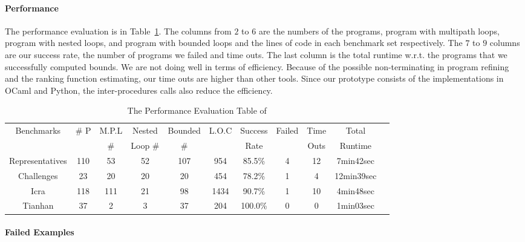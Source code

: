 \paragraph{Performance}
The performance evaluation is in Table~\ref{tb:performance-eval}.
The columns from $2$ to $6$ are the numbers of the programs, program with multipath loops, program with nested loops, and program with bounded loops and the lines of code in each benchmark set respectively.
The $7$ to $9$ columns are our success rate, the number of programs we failed and time outs. The last column is the total runtime w.r.t. the programs that we successfully computed bounds.
We are not doing well in terms of efficiency. Because of the possible non-terminating in program refining and the ranking function estimating, our time outs are higher than other tools.
Since our prototype consists of the implementations in OCaml and Python, the inter-procedures calls also reduce the efficiency.
%
%
\begin{table}[H]
\caption{The Performance Evaluation Table of {\PSRB}}
\label{tb:performance-eval}
    \centering
{\scriptsize
\begin{tabular}{ | c | c | c | c | c | c | c | c | c | c | c |}
\hline
\hline
\multirow{2}{*}{Benchmarks} & \multirow{2}{*}{\# P}  & {M.P.L} & Nested  & {Bounded} 
& \multirow{2}{*}{L.O.C} & {Success} & \multirow{2}{*}{Failed} & Time  & Total
\\
&  & \# & Loop \# & \# & & Rate &  & Outs &   Runtime \\
\hline
\hline 
{Representatives} & {110}  & 53  & 52  & 107 & 954 & 85.5\% & 4 & 12 & 7min42sec \\
\hline
Challenges & 23  & 20 & 20 & {20} & 454 & {78.2\%}  & 1 & 4 & {12min39sec} \\
\hline
{Icra} & 118 & 111 & 21 & 98 & 1434  & 90.7\% & 1 & 10 & {4min48sec} \\
\hline
Tianhan & 37 & 2 & 3 & 37 & 204 & 100.0\% & 0 & 0 & 1min03sec \\
\hline
\hline
\end{tabular}    
}
\end{table}

\paragraph{Failed Examples}